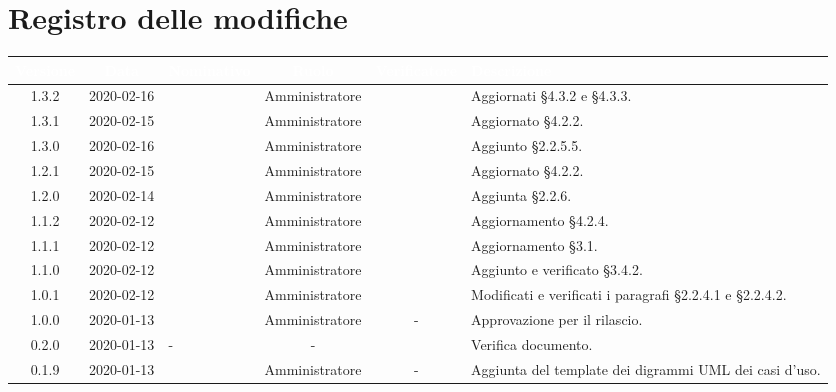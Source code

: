 \section*{Registro delle modifiche}
{
\renewcommand{\arraystretch}{1.5}
\centering
\begin{longtable}{ c c  C{2.5cm} c c C{3.5cm}}
\textcolor{white}{\textbf{Versione}}&
\textcolor{white}{\textbf{Data}}&
\textcolor{white}{\textbf{Nominativo}}&
\textcolor{white}{\textbf{Ruolo}}&
\textcolor{white}{\textbf{Verificatore}}&
\textcolor{white}{\textbf{Descrizione}}\\	
\endhead

1.3.2 & 2020-02-16 & \SE{} & Amministratore & \CE{} & Aggiornati §4.3.2 e §4.3.3. \\

1.3.1 & 2020-02-15 & \SE{} & Amministratore & \CE{} & Aggiornato §4.2.2. \\

1.3.0 & 2020-02-16 & \SE{} & Amministratore & \CE{} & Aggiunto §2.2.5.5. \\

1.2.1 & 2020-02-15 & \SE{} & Amministratore & \CE{} & Aggiornato §4.2.2. \\

1.2.0 & 2020-02-14 & \SE{} & Amministratore & \CE{} & Aggiunta §2.2.6. \\

1.1.2 & 2020-02-12 & \SE{} & Amministratore & \CE{} & Aggiornamento §4.2.4. \\ 

1.1.1 & 2020-02-12 & \BR{} & Amministratore & \CE{} & Aggiornamento §3.1. \\ 

1.1.0 & 2020-02-12 & \BR{} & Amministratore & \CE{} & Aggiunto e verificato §3.4.2. \\

1.0.1 & 2020-02-12 & \SE{} & Amministratore & \CE{} & Modificati e verificati i paragrafi §2.2.4.1 e §2.2.4.2. \\ 

1.0.0 & 2020-01-13 & \AT{} & Amministratore & - & Approvazione per il rilascio.  \\

0.2.0 & 2020-01-13 & - & - & \PF{} & Verifica documento.  \\ 

0.1.9 & 2020-01-13 & \CE{} & Amministratore & - & Aggiunta del template dei digrammi UML dei casi d'uso. \\


\end{longtable}}
